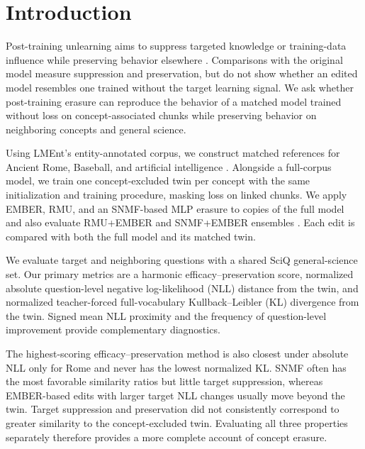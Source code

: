 \section{Introduction}
\label{sec:introduction}

Post-training unlearning aims to suppress targeted knowledge or training-data
influence while preserving behavior elsewhere
\citep{yao2024machineunlearning,li2024wmdp}. Comparisons with the original
model measure suppression and preservation, but do not show whether an edited
model resembles one trained without the target learning signal. We ask whether
post-training erasure can reproduce the behavior of a matched model trained
without loss on concept-associated chunks while preserving behavior on
neighboring concepts and general science.

Using LMEnt's entity-annotated corpus, we construct matched references for
Ancient Rome, Baseball, and artificial intelligence
\citep{gottesman2025lment}. Alongside a full-corpus model, we train one
concept-excluded twin per concept with the same initialization and training
procedure, masking loss on linked chunks. We apply EMBER, RMU, and an
SNMF-based MLP erasure to copies of the full model and also evaluate RMU+EMBER
and SNMF+EMBER ensembles
\citep{suslik2026ember,li2024wmdp,shafran2026snmf}. Each edit is compared with
both the full model and its matched twin.

We evaluate target and neighboring questions with a shared SciQ
general-science set. Our primary metrics are a harmonic efficacy--preservation score, normalized
absolute question-level negative log-likelihood (NLL) distance from the twin,
and normalized teacher-forced full-vocabulary Kullback--Leibler (KL)
divergence from the twin. Signed mean NLL
proximity and the frequency of question-level improvement provide
complementary diagnostics.

The highest-scoring efficacy--preservation method is also closest under
absolute NLL only for Rome and never has the lowest normalized KL. SNMF often
has the most favorable similarity ratios but little target suppression,
whereas EMBER-based edits with larger target NLL changes usually move beyond
the twin. Target suppression and preservation did not consistently correspond to greater
similarity to the concept-excluded twin. Evaluating all three properties
separately therefore provides a more complete account of concept erasure.